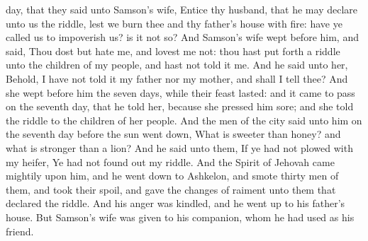 day, that they said unto Samson’s wife, Entice thy husband, that he may declare unto us the riddle, lest we burn thee and thy father’s house with fire: have ye called us to impoverish us? is it not so? And Samson’s wife wept before him, and said, Thou dost but hate me, and lovest me not: thou hast put forth a riddle unto the children of my people, and hast not told it me. And he said unto her, Behold, I have not told it my father nor my mother, and shall I tell thee? And she wept before him the seven days, while their feast lasted: and it came to pass on the seventh day, that he told her, because she pressed him sore; and she told the riddle to the children of her people. And the men of the city said unto him on the seventh day before the sun went down, What is sweeter than honey? and what is stronger than a lion? And he said unto them, If ye had not plowed with my heifer, Ye had not found out my riddle.  And the Spirit of Jehovah came mightily upon him, and he went down to Ashkelon, and smote thirty men of them, and took their spoil, and gave the changes of raiment unto them that declared the riddle. And his anger was kindled, and he went up to his father’s house. But Samson’s wife was given to his companion, whom he had used as his friend. 


